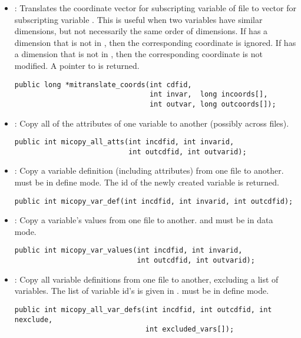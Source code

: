 \documentclass{article}
\begin{document}
\begin{itemize}
\item {} : Translates the coordinate vector
 for subscripting variable  of file
 to vector  for subscripting variable
. This is useful when two variables have similar
dimensions, but not necessarily the same order of dimensions. If
 has a dimension that is not in , then the
corresponding coordinate is ignored. If  has a dimension
that is not in , then the corresponding coordinate is not
modified. A pointer to  is returned.
\begin{verbatim}
public long *mitranslate_coords(int cdfid, 
                                int invar,  long incoords[],
                                int outvar, long outcoords[]);
\end{verbatim}

\item {} : Copy all of the attributes of one
variable to another (possibly across files).
\begin{verbatim}
public int micopy_all_atts(int incdfid, int invarid, 
                           int outcdfid, int outvarid);
\end{verbatim}

\item {} : Copy a variable definition (including
attributes) from one file to another.  must be in
define mode. The id of the newly created variable is returned.
\begin{verbatim}
public int micopy_var_def(int incdfid, int invarid, int outcdfid);
\end{verbatim}

\item {} : Copy a variable's values from one
file to another.  and  must be in data
mode.
\begin{verbatim}
public int micopy_var_values(int incdfid, int invarid, 
                             int outcdfid, int outvarid);
\end{verbatim}

\item {} : Copy all variable definitions from
one file to another, excluding a list of variables. The list of
 variable id's is given in .
 must be in define mode.
\begin{verbatim}
public int micopy_all_var_defs(int incdfid, int outcdfid, int nexclude,
                               int excluded_vars[]);
\end{verbatim}


\end{itemize}
\end{document}
